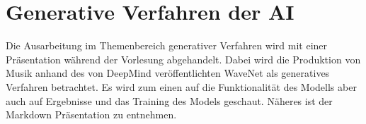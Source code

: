 \chapter{Generative Verfahren der \ac{AI}}

Die Ausarbeitung im Themenbereich generativer Verfahren wird mit einer Präsentation während der Vorlesung abgehandelt. Dabei wird die Produktion von Musik anhand des von DeepMind veröffentlichten WaveNet als generatives Verfahren betrachtet. Es wird zum einen auf die Funktionalität des Modells aber auch auf Ergebnisse und das Training des Models geschaut. Näheres ist der Markdown Präsentation zu entnehmen.